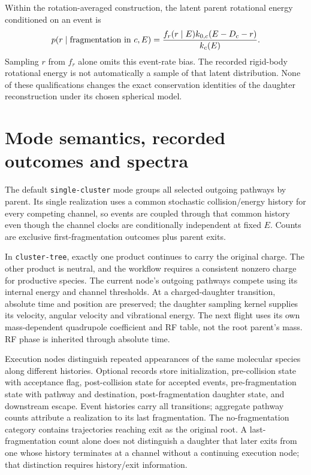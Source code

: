 \documentclass[10pt,a4paper]{article}
\begin{document}
Within the rotation-averaged construction, the latent parent rotational
energy conditioned on an event is
\[
 p(r\mid\hbox{fragmentation in }c,E)=
 \frac{f_r(r\mid E)k_{0,c}(E-D_c-r)}{k_c(E)}.
\]
Sampling $r$ from $f_r$ alone omits this event-rate bias. The recorded
rigid-body rotational energy is not automatically a sample of that latent
distribution. None of these qualifications changes the exact conservation
identities of the daughter reconstruction under its chosen spherical model.

\clearpage
\section{Mode semantics, recorded outcomes and spectra}\label{app:modes}
The default \texttt{single-cluster} mode groups all selected outgoing pathways
by parent. Its single realization uses a common stochastic collision/energy
history for every competing channel, so events are coupled through that common
history even though the channel clocks are conditionally independent at fixed
$E$. Counts are exclusive first-fragmentation outcomes plus parent exits.

In \texttt{cluster-tree}, exactly one product continues to carry the original
charge. The other product is neutral, and the workflow requires a consistent
nonzero charge for productive species. The current node's outgoing pathways
compete using its internal energy and channel thresholds. At a charged-daughter
transition, absolute time and position are preserved; the daughter sampling
kernel supplies its velocity, angular velocity and vibrational energy. The
next flight uses its own mass-dependent quadrupole coefficient and RF table,
not the root parent's mass. RF phase is inherited through absolute time.

Execution nodes distinguish repeated appearances of the same molecular
species along different histories. Optional records store initialization,
pre-collision state with acceptance flag, post-collision state for accepted
events, pre-fragmentation state with pathway and destination, post-fragmentation
daughter state, and downstream escape. Event histories carry all transitions;
aggregate pathway counts attribute a realization to its last fragmentation.
The no-fragmentation category contains trajectories reaching exit as the
original root. A last-fragmentation count alone does not distinguish a daughter
that later exits from one whose history terminates at a channel without a
continuing execution node; that distinction requires history/exit information.
\end{document}

